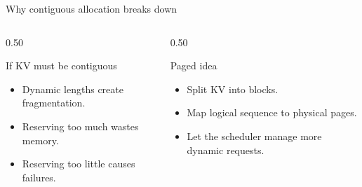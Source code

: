 \documentclass[aspectratio=169,11pt]{beamer}
\begin{document}
\begin{frame}{Why contiguous allocation breaks down}
  \begin{columns}[T,totalwidth=\textwidth]
    \begin{column}{0.50\textwidth}
      \begin{block}{If KV must be contiguous}
        \begin{itemize}
          \item Dynamic lengths create fragmentation.
          \item Reserving too much wastes memory.
          \item Reserving too little causes failures.
        \end{itemize}
      \end{block}
    \end{column}
    \begin{column}{0.50\textwidth}
      \begin{block}{Paged idea}
        \begin{itemize}
          \item Split KV into blocks.
          \item Map logical sequence to physical pages.
          \item Let the scheduler manage more dynamic requests.
        \end{itemize}
      \end{block}
    \end{column}
  \end{columns}
\end{frame}
\end{document}
